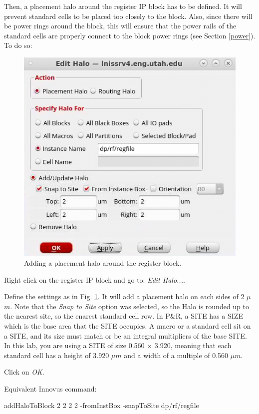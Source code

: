 Then, a placement halo around the register IP block has to be defined. It will prevent standard cells to be placed too closely to the block. Also, since there will be power rings around the block, this will ensure that the power rails of the standard cells are properly connect to the block power rings (see Section \ref{power}). To do so:

\begin{enumerate}
	\parbox[t]{\dimexpr\textwidth-\leftmargin}{%
		\begin{figure}
			\vspace{-3mm}
			\centering
			\vspace{-\baselineskip}
			\includegraphics[scale=0.32]{figures/lab5_backend/halo_reg}
			\caption{Adding a placement halo around the register block.}
			\label{halo_reg}
		\end{figure}
		\item Right click on the register IP block and go to: \textit{Edit Halo...}.
\item Define the settings as in Fig. \ref{halo_reg}. It will add a placement halo on each sides of 2 $\mu$$m$. Note that the \textit{Snap to Site} option was selected, so the Halo is rounded up to the nearest site, so the enarest standard cell row. In P\&R, a SITE has a SIZE which is the base area that the SITE occupies. A macro or a standard cell sit on a SITE, and its size must match or be an integral multipliers of the base SITE. In this lab, you are using a SITE of size 0.560 $\times$ 3.920, meaning that each standard cell has a height of 3.920 $\mu m$ and a width of a multiple of 0.560 $\mu m$.

\item Click on \textit{OK}.
	}
\end{enumerate}
			\vspace{20mm}
Equivalent Innovus command:
\begin{codeline}
addHaloToBlock {2 2 2 2} -fromInstBox -snapToSite dp/rf/regfile
\end{codeline}

